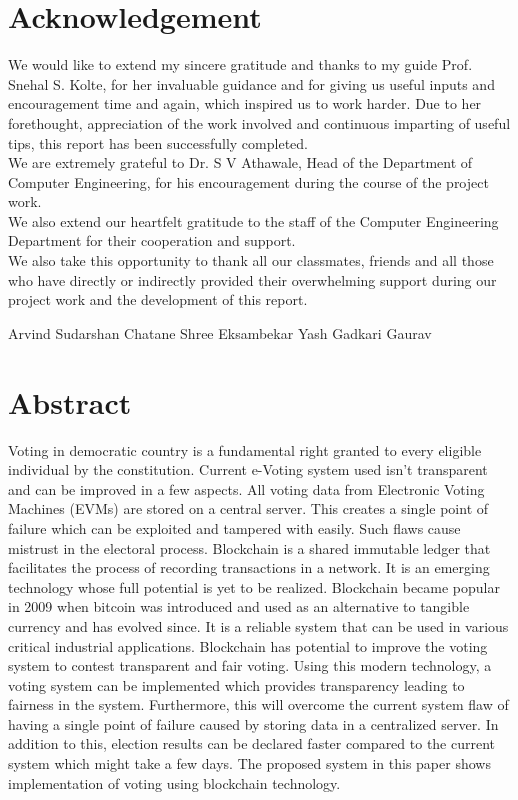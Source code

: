 \documentclass[oneside, 12pt]{book}
\begin{document}
	\chapter*{Acknowledgement}
		We would like to extend my sincere gratitude and thanks to my guide Prof. Snehal S. Kolte, for her invaluable guidance and for giving us useful inputs and encouragement time and again, which inspired us to work harder. Due to her forethought, appreciation of the work involved and continuous imparting of useful tips, this report has been successfully completed.\break
		\\We are extremely grateful to Dr. S V Athawale, Head of the Department of Computer Engineering, for his encouragement during the course of the project work.\break
		\\We also extend our heartfelt gratitude to the staff of the Computer Engineering Department for their cooperation and support.\break
		\\We also take this opportunity to thank all our classmates, friends and all those who have directly or indirectly provided their overwhelming support during our project work and the development of this report.\break\break\break\break\break\break\break\break

		\begin{flushright}
		Arvind Sudarshan\break
		Chatane Shree\break
		Eksambekar Yash\break
		Gadkari Gaurav
		\end{flushright}
		
	\chapter*{Abstract}
		Voting in democratic country is a fundamental right granted to every eligible individual by the constitution. Current e-Voting system used isn’t transparent and can be improved in a few aspects. All voting data from Electronic Voting Machines (EVMs) are stored on a central server. This creates a single point of failure which can be exploited and tampered with easily. Such flaws cause mistrust in the electoral process. Blockchain is a shared  immutable ledger that facilitates the process of recording transactions in a network. It is an emerging technology whose full potential is yet to be realized. Blockchain became popular in 2009 when bitcoin was introduced and used as an alternative to tangible currency and has evolved since. It is a reliable system that can be used in various critical industrial applications. Blockchain has potential to improve the voting system to contest transparent and fair voting. Using this modern technology, a voting system can be implemented which provides transparency leading to fairness in the system. Furthermore, this will overcome the current system flaw of having a single point of failure caused by storing data in a centralized server. In addition to this, election results can be declared faster compared to the current system which might take a few days. The proposed system in this paper shows implementation of voting using blockchain technology.\\\\
	\tableofcontents
	\listoffigures
	\listoftables
	
\end{document}

